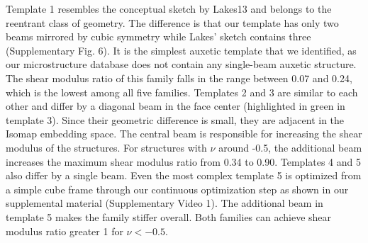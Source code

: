 Template 1 resembles the conceptual sketch by Lakes13 and belongs to the reentrant class of geometry. The difference is that our template has only two beams mirrored by cubic symmetry while Lakes' sketch contains three (Supplementary Fig. 6). It is the simplest auxetic template that we identified, as our microstructure database does not contain any single-beam auxetic structure. The shear modulus ratio of this family falls in the range between 0.07 and 0.24, which is the lowest among all five families. Templates 2 and 3 are similar to each other and differ by a diagonal beam in the face center (highlighted in green in template 3). Since their geometric difference is small, they are adjacent in the Isomap embedding space. The central beam is responsible for increasing the shear modulus of the structures. For structures with $\nu$ around -0.5, the additional beam increases the maximum shear modulus ratio from 0.34 to 0.90. Templates 4 and 5 also differ by a single beam. Even the most complex template 5 is optimized from a simple cube frame through our continuous optimization step as shown in our supplemental material (Supplementary Video 1). The additional beam in template 5 makes the family stiffer overall. Both families can achieve shear modulus ratio greater 1 for $\nu<-0.5$.

